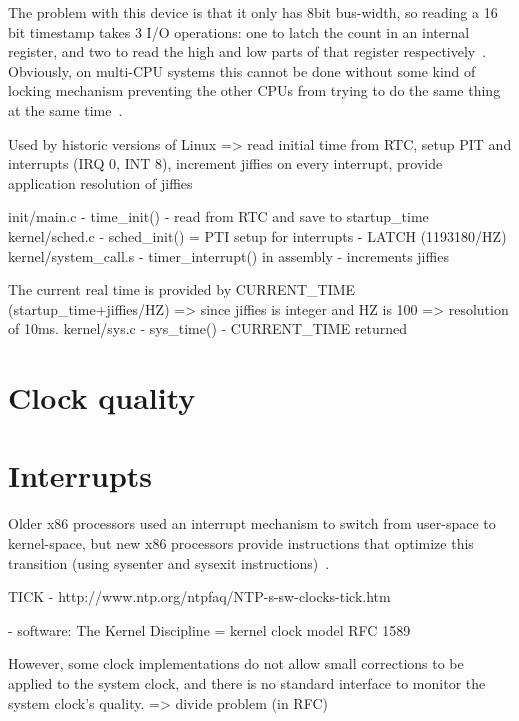 The problem with this device is that it only has
8bit bus-width, so reading a 16 bit timestamp takes
3 I/O operations: one to latch the count in an internal register,
and two to read the high and low parts
of that register respectively~\cite{timecounters}.
Obviously, on multi-CPU systems this cannot be
done without some kind of locking mechanism
preventing the other CPUs from trying to do the
same thing at the same time~\cite{timecounters}.


Used by historic versions of Linux
=> read initial time from RTC, setup PIT and interrupts (IRQ 0, INT 8), increment jiffies on every interrupt, provide application resolution of jiffies

init/main.c - time\_init() - read from RTC and save to startup\_time
kernel/sched.c - sched\_init() = PTI setup for interrupts - LATCH (1193180/HZ)
kernel/system\_call.s - timer\_interrupt() in assembly - increments jiffies

The current real time is provided by CURRENT\_TIME (startup\_time+jiffies/HZ) => since jiffies is integer and HZ is 100 => resolution of 10ms.
kernel/sys.c - sys\_time() - CURRENT\_TIME returned

\section{Clock quality}

\section{Interrupts}
Older x86 processors used an interrupt mechanism to switch from
user-space to kernel-space, but new x86 processors provide instructions
that optimize this transition (using sysenter and sysexit instructions)~\cite{ibm-linux-system-calls}.


TICK - http://www.ntp.org/ntpfaq/NTP-s-sw-clocks-tick.htm


- software:
The Kernel Discipline =  kernel clock model RFC 1589

However, some clock implementations do not allow small corrections to be applied to the system clock, and there is no standard interface to monitor the system clock's quality.
=> divide problem (in RFC)
